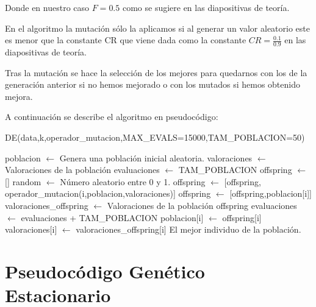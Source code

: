 \documentclass[12pt,a4paper]{article}
\begin{document}
	Donde en nuestro caso $F=0.5$ como se sugiere en las diapositivas de teoría.
	
	En el algoritmo la mutación sólo la aplicamos si al generar un valor aleatorio este es menor que la constante CR que viene dada como la constante $CR = \frac{0.1}{0.9}$ en las diapositivas de teoría.
	
	Tras la mutación se hace la selección de los mejores para quedarnos con los de la generación anterior si no hemos mejorado o con los mutados si hemos obtenido mejora.
	
	A continuación se describe el algoritmo en pseudocódigo:
	
	\begin{algorithm}
		\caption{DE(data,k,operador\_mutacion,MAX\_EVALS=15000,TAM\_POBLACION=50)}
		\begin{algorithmic}			
			\STATE poblacion $\leftarrow$ Genera una población inicial aleatoria.
			\STATE valoraciones $\leftarrow$ Valoraciones de la población
			\STATE 
			\STATE evaluaciones $\leftarrow$ TAM\_POBLACION
			\STATE 
				\STATE offspring $\leftarrow$ []
					\STATE random $\leftarrow$ Número aleatorio entre 0 y 1.
						\STATE offspring $\leftarrow$ [offspring, operador\_mutacion(i,poblacion,valoraciones)]
					\ELSE
						\STATE offspring $\leftarrow$ [offspring,poblacion[i]]
					\ENDIF
				\ENDFOR
				\STATE valoraciones\_offspring $\leftarrow$ Valoraciones de la población offspring
				\STATE evaluaciones $\leftarrow$ evaluaciones + TAM\_POBLACION
				\STATE 
						\STATE poblacion[i] $\leftarrow$ offspring[i]
						\STATE valoraciones[i] $\leftarrow$ valoraciones\_offspring[i]
					\ENDIF
				\ENDFOR
			\ENDWHILE
			\RETURN El mejor individuo de la población.
		\end{algorithmic}
	\end{algorithm}
	
	\newpage

	\section{Pseudocódigo Genético Estacionario}
	\label{sec:GE}
\end{document}
